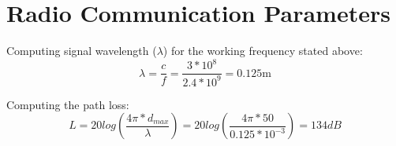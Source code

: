 \section*{Radio Communication Parameters}

Computing signal wavelength ($\lambda$) for the working frequency stated above:
\begin{equation*}\label{eq:tech_parameters3}
	\lambda = \frac{c}{f} = \frac{3*10^{8}}{2.4*10^{9}} = 0.125 \text{m}
\end{equation*}

Computing the path loss:
\begin{equation*}\label{eq:tech_parameters4}
	L = 20log\left (\frac{4\pi*d_{max}}{\lambda} \right)
	  = 20log\left (\frac{4\pi*50}{0.125*10^{-3}} \right)
	  = 134 dB 
\end{equation*}

